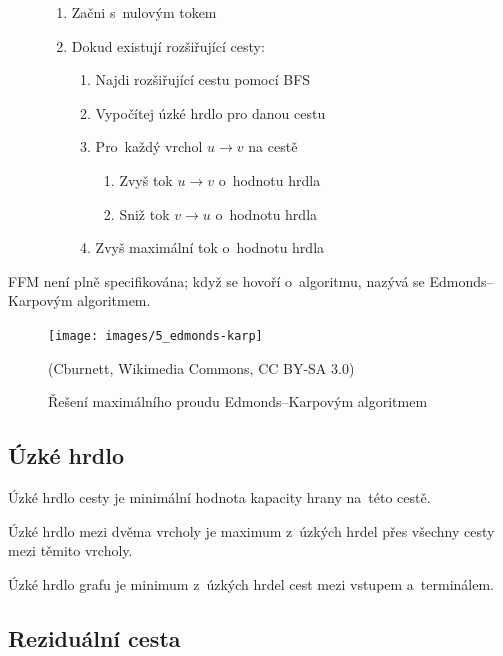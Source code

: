 \begin{figure}[ht]
    \onehalfspacing
    \begin{enumerate}
        \item Začni s~nulovým tokem
        \item Dokud existují rozšiřující cesty:
              \begin{enumerate}
                  \item Najdi rozšiřující cestu pomocí BFS
                  \item Vypočítej úzké hrdlo pro danou cestu
                  \item Pro~každý vrchol $u \rightarrow v$ na cestě
                        \begin{enumerate}
                            \item Zvyš tok $u \rightarrow v$ o~hodnotu hrdla
                            \item Sniž tok $v \rightarrow u$ o~hodnotu hrdla
                        \end{enumerate}
                  \item Zvyš maximální tok o~hodnotu hrdla
              \end{enumerate}
    \end{enumerate}
\end{figure}

FFM není plně specifikována; když se hovoří o~algoritmu, nazývá se Edmonds--Karpovým algoritmem.

\begin{figure}[ht]
    \centering
    \texttt{[image: images/5\_edmonds-karp]}
    \caption{Řešení maximálního proudu Edmonds--Karpovým algoritmem}
    {\small (Cburnett, Wikimedia Commons, CC BY-SA 3.0)}
\end{figure}
\FloatBarrier

\subsection{Úzké hrdlo}

Úzké hrdlo cesty je minimální hodnota kapacity hrany na~této cestě.

Úzké hrdlo mezi dvěma vrcholy je maximum z~úzkých hrdel přes všechny cesty mezi těmito vrcholy.

Úzké hrdlo grafu je minimum z~úzkých hrdel cest mezi vstupem a~terminálem.

\subsection{Reziduální cesta}


